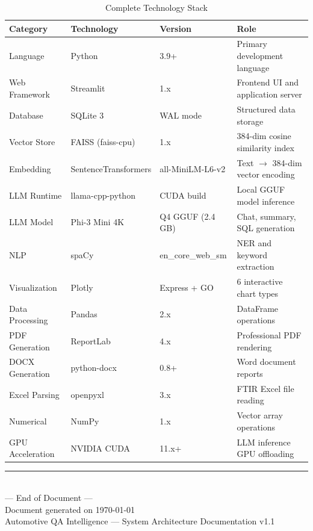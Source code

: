 \documentclass[12pt, a4paper, twoside]{article}
\begin{document}
\begin{table}[H]
\centering
\caption{Complete Technology Stack}
\label{tab:tech-stack}
\begin{tabularx}{\textwidth}{L{2cm} L{2.8cm} L{3cm} X}
\toprule
{}\color{white}\textbf{Category} & \color{white}\textbf{Technology} & \color{white}\textbf{Version} & \color{white}\textbf{Role} \\
\midrule
Language & Python & 3.9+ & Primary development language \\
Web Framework & Streamlit & 1.x & Frontend UI and application server \\
Database & SQLite 3 & WAL mode & Structured data storage \\
Vector Store & FAISS (faiss-cpu) & 1.x & 384-dim cosine similarity index \\
Embedding & SentenceTransformers & all-MiniLM-L6-v2 & Text $\rightarrow$ 384-dim vector encoding \\
LLM Runtime & llama-cpp-python & CUDA build & Local GGUF model inference \\
LLM Model & Phi-3 Mini 4K & Q4 GGUF (2.4 GB) & Chat, summary, SQL generation \\
NLP & spaCy & en\_core\_web\_sm & NER and keyword extraction \\
Visualization & Plotly & Express + GO & 6 interactive chart types \\
Data Processing & Pandas & 2.x & DataFrame operations \\
PDF Generation & ReportLab & 4.x & Professional PDF rendering \\
DOCX Generation & python-docx & 0.8+ & Word document reports \\
Excel Parsing & openpyxl & 3.x & FTIR Excel file reading \\
Numerical & NumPy & 1.x & Vector array operations \\
GPU Acceleration & NVIDIA CUDA & 11.x+ & LLM inference GPU offloading \\
\bottomrule
\end{tabularx}
\end{table}

\vspace{1cm}

\begin{center}
  {\color{skyblue}\rule{6cm}{1.5pt}}\\[0.5cm]
  {\color{slate400}\large — End of Document —}\\[0.3cm]
  {\color{slate500}\small Document generated on \today}\\[0.2cm]
  {\color{slate500}\footnotesize Automotive QA Intelligence — System Architecture Documentation v1.1}
\end{center}
\end{document}
